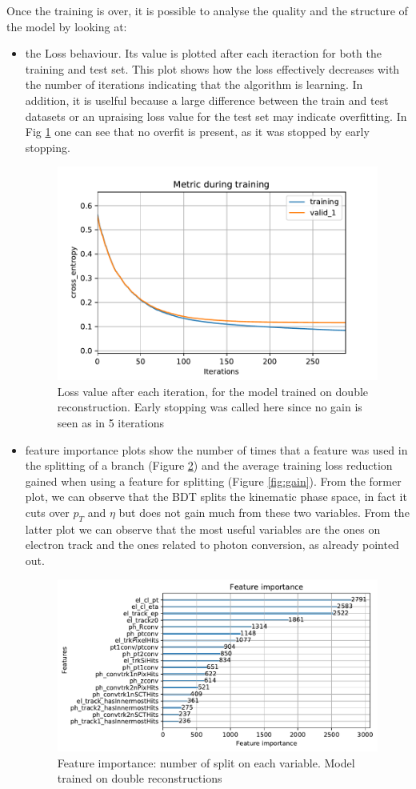 \documentclass[a4paper, oneside, 11pt, openright]{book}
\begin{document}
			Once the training is over, it is possible to analyse the quality and the structure of the model by looking at:
			\begin{itemize}
				\item the Loss behaviour. Its value is plotted after each iteraction for both the training and test set. This plot shows how the loss effectively decreases with the number of iterations indicating that the algorithm is learning. In addition, it is uselful because a large difference between the train and test datasets or an upraising loss value for the test set may indicate overfitting. In Fig \ref{fig:loss} one can see that no overfit is present, as it was stopped by early stopping.
				
				\begin{figure}[h!]
					\centering
					\includegraphics[width=.6\linewidth]{tesi_images/model_hyper_loss.pdf} 
					\caption{Loss value after each iteration, for the model trained on double reconstruction. Early stopping was called here since no gain is seen as in 5 iterations}
					\label{fig:loss} 
				\end{figure}
				
				\item feature importance plots show the number of times that a feature was used in the splitting of a branch (Figure \ref{fig:importance}) and the average training loss reduction gained when using a feature for splitting (Figure \ref{fig:gain}). From the former plot, we can observe that the BDT splits the kinematic phase space, in fact it cuts over $p_T$ and $\eta$ but does not gain much from these two variables. From the latter plot we can observe that the most useful variables are the ones on electron track and the ones related to photon conversion, as already pointed out.
				
				\begin{figure}[h!]
					\centering
					\includegraphics[width=.8\linewidth]{tesi_images/model_hyper_importance.pdf} 
					\caption{Feature importance: number of split on each variable. Model trained on double reconstructions}
					\label{fig:importance} 
				\end{figure}
				

\end{itemize}
\end{document}

